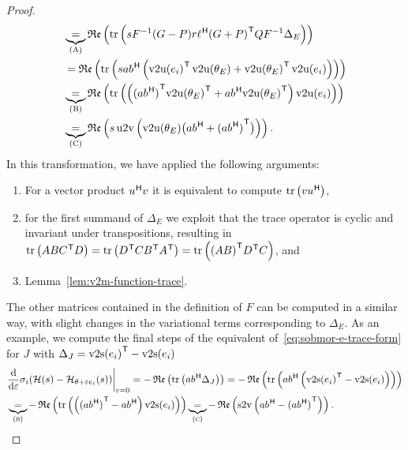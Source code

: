 \begin{proof}
\begin{equation}
\begin{aligned}
             &\underbrace{=}_{(\msc{A})} \re{\trace{s F\inv (G - P) r \ell\herm {(G + P)}\trans Q F\inv \Delta_E}} \\
             &= \re{\trace{s a b\herm \left( {\vecupper(e_i)}\trans \vecupper(\theta_E) + {\vecupper(\theta_E)}\trans \vecupper(e_i) \right)}} \\
             &\underbrace{=}_{(\msc{B})} \re{\trace{\left( {(a b\herm)}\trans {\vecupper(\theta_E)}\trans + a b\herm {\vecupper(\theta_E)}\trans \right) \vecupper(e_i)}} \\
             &\underbrace{=}_{(\msc{C})} \re{s \uppervec\left( \vecupper(\theta_E) \bigl( a b\herm + {(a b\herm)}\trans \bigr) \right)}.
        \end{aligned}
    \end{equation}
    In this transformation, we have applied the following arguments:
    \begin{enumerate}[label= (\scshape{\alph*}):]
        \item For a vector product $u^{\mkern1mu \mathsf{H}} v$ it is equivalent to compute $\mathop{}\!\mathrm{tr}\left(v u^{\mkern1mu \mathsf{H}}\right)$,
        \item for the first summand of $\Delta_E$ we exploit that the trace operator is cyclic and invariant under transpositions, resulting in $\mathop{}\!\mathrm{tr}\left(A B C^{\mkern1mu \mathsf{T}} D\right) = \mathop{}\!\mathrm{tr}\left(D^{\mkern1mu \mathsf{T}} C B^{\mkern1mu \mathsf{T}} A^{\mkern1mu \mathsf{T}}\right) = \mathop{}\!\mathrm{tr}\left({(A B)}^{\mkern1mu \mathsf{T}} D^{\mkern1mu \mathsf{T}} C\right)$, and
        \item Lemma~\ref{lem:v2m-function-trace}.
    \end{enumerate}
    The other matrices contained in the definition of $F$ can be computed in a similar way, with slight changes in the variational terms corresponding to $\Delta_E$.
    As an example, we compute the final steps of the equivalent of~\eqref{eq:sobmor-e-trace-form} for $J$ with $\Delta_J = {\mathop{}\!\mathrm{v}2\mathrm{s}(e_i)}^{\mkern1mu \mathsf{T}} - \mathop{}\!\mathrm{v}2\mathrm{s}(e_i)$
    \begin{equation*}
        \begin{aligned}
            &\res{\frac{\dif}{\dif \varepsilon} \sigma_i(\mcl{H}(s) - \mcl{H}_{\theta + \varepsilon e_i}(s))}{\varepsilon = 0} = - \re{\trace{a b\herm \Delta_J}} = - \re{\trace{a b\herm \left({\vecstrict(e_i)}\trans - \vecstrict(e_i)\right)}} \\
             &\underbrace{=}_{(\msc{b})} - \re{\trace{\left( {(a b\herm)}\trans - a b\herm \right) \vecstrict(e_i)}} \underbrace{=}_{(\msc{c})} - \re{\strictvec\left( a b\herm - {(a b\herm)}\trans \right)}.
        \end{aligned}
    \end{equation*}


\end{proof}
